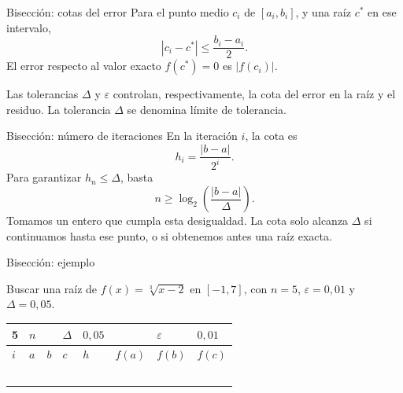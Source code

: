 \documentclass[original_version/main.tex]{subfiles}
\begin{document}
\begin{frame}{Bisección: cotas del error}
Para el punto medio $c_i$ de $[a_i,b_i]$, y una raíz $c^*$ en ese intervalo,\[|c_i-c^*|\le\frac{b_i-a_i}{2}.\]El error respecto al valor exacto $f(c^*)=0$ es $|f(c_i)|$.\par\medskip Las tolerancias $\Delta$ y $\varepsilon$ controlan, respectivamente, la cota del error en la raíz y el residuo. La tolerancia $\Delta$ se denomina límite de tolerancia.
\end{frame}

\begin{frame}{Bisección: número de iteraciones}
En la iteración $i$, la cota es\[h_i=\frac{|b-a|}{2^i}.\]Para garantizar $h_n\le\Delta$, basta\[n\ge\log_2\!\left(\frac{|b-a|}{\Delta}\right).\]Tomamos un entero que cumpla esta desigualdad. La cota solo alcanza $\Delta$ si continuamos hasta ese punto, o si obtenemos antes una raíz exacta.
\end{frame}

\begin{frame}[t]{Bisección: ejemplo}
\begin{minipage}[t][13mm][t]{\textwidth}\small Buscar una raíz de $f(x)=\sqrt[3]{x-2}$ en $[-1,7]$, con $n=5$, $\varepsilon=0{,}01$ y $\Delta=0{,}05$.\end{minipage}\par{\scriptsize\setlength{\tabcolsep}{2pt}\renewcommand{\arraystretch}{1}\begin{center}\begin{tabular}{|C{.04\textwidth}|C{.112\textwidth}|C{.112\textwidth}|C{.112\textwidth}|C{.112\textwidth}|C{.112\textwidth}|C{.112\textwidth}|C{.112\textwidth}|}
\hline
\rule{0pt}{4.3mm}5 & $n$ &  &  $\Delta$  & $0{,}05$ &  & $\varepsilon$ & $0{,}01$\\\hline
\rule{0pt}{4.3mm}$i$ & $a$ & $b$ & $c$ & $h$ & $f(a)$ & $f(b)$ & $f(c)$\\\hline
\rule{0pt}{4.3mm} &  &  &  &  &  &  & \\\hline
\rule{0pt}{4.3mm} &  &  &  &  &  &  & \\\hline
\rule{0pt}{4.3mm} &  &  &  &  &  &  & \\\hline
\rule{0pt}{4.3mm} &  &  &  &  &  &  & \\\hline
\rule{0pt}{4.3mm} &  &  &  &  &  &  & \\\hline
\end{tabular}\end{center}}\begin{minipage}[t][10mm][t]{\textwidth}\footnotesize \end{minipage}
\end{frame}
\end{document}
